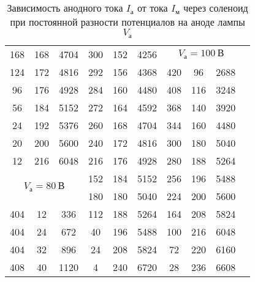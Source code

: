 \begin{table}[H]
\begin{tabular}{|c|c|c||c|c|c||c|c|c||c|c|c|}
168          & 168          & 4704        & 300    & 152   & 4256   &
\multicolumn{3}{c||}{$V_\text{а} = 100 \ \text{В}$} & \multicolumn{3}{c}{}                   \\ \cline{1-9}
124          & 172          & 4816        & 292    & 156   & 4368   & 420     & 96    & 2688   & \multicolumn{3}{c}{}                   \\ \cline{1-9}
96           & 176          & 4928        & 284    & 160   & 4480   & 408     & 116   & 3248   & \multicolumn{3}{c}{}                   \\ \cline{1-9}
56           & 184          & 5152        & 272    & 164   & 4592   & 368     & 140   & 3920   & \multicolumn{3}{c}{}                   \\ \cline{1-9}
24           & 192          & 5376        & 260    & 168   & 4704   & 344     & 160   & 4480   & \multicolumn{3}{c}{}                   \\ \cline{1-9}
20           & 200          & 5600        & 240    & 172   & 4816   & 300     & 180   & 5040   & \multicolumn{3}{c}{}                   \\ \cline{1-9}
12           & 216          & 6048        & 216    & 176   & 4928   & 280     & 188   & 5264   & \multicolumn{3}{c}{}                   \\ \cline{1-9}
\multicolumn{3}{|c||}{\multirow{2}{*}{$V_\text{а} = 80\ \text{В}$}} & 152    & 184   & 5152   & 256     & 196   & 5488   & \multicolumn{3}{c}{}                   \\ \cline{4-9}
\multicolumn{3}{|c||}{}                    & 180    & 180   & 5040   & 224     & 200   & 5600   & \multicolumn{3}{c}{}                   \\ \cline{1-9}
404          & 12           & 336         & 112    & 188   & 5264   & 164     & 208   & 5824   & \multicolumn{3}{c}{}                   \\ \cline{1-9}
404          & 24           & 672         & 40     & 196   & 5488   & 100     & 216   & 6048   & \multicolumn{3}{c}{}                   \\ \cline{1-9}
404          & 32           & 896         & 24     & 208   & 5824   & 72      & 220   & 6160   & \multicolumn{3}{c}{}                   \\ \cline{1-9}
408          & 40           & 1120        & 4      & 240   & 6720   & 28      & 236   & 6608   &
\multicolumn{3}{c}{}                   \\ \cline{1-9}
\end{tabular}
\captionsetup{justification=centering}
\caption{Зависимость анодного тока $I_\text{а}$ от тока $I_\text{м}$ через соленоид при постоянной
разности потенциалов на аноде лампы $V_\text{а}$}
\end{table}

